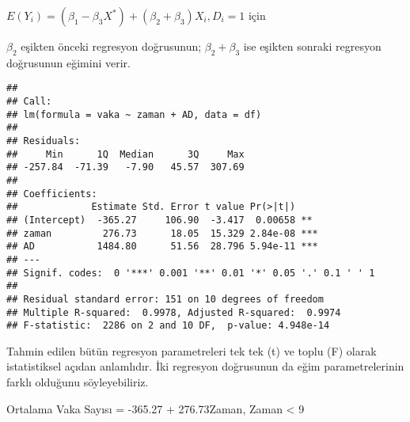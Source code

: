 \documentclass[
]{book}
\newenvironment{Shaded}{\begin{snugshade}}{\end{snugshade}}
\newcommand{\CommentTok}[1]{\textcolor[rgb]{0.56,0.35,0.01}{\textit{#1}}}
\newcommand{\DataTypeTok}[1]{\textcolor[rgb]{0.13,0.29,0.53}{#1}}
\newcommand{\DecValTok}[1]{\textcolor[rgb]{0.00,0.00,0.81}{#1}}
\newcommand{\KeywordTok}[1]{\textcolor[rgb]{0.13,0.29,0.53}{\textbf{#1}}}
\newcommand{\NormalTok}[1]{#1}
\newcommand{\OperatorTok}[1]{\textcolor[rgb]{0.81,0.36,0.00}{\textbf{#1}}}
\newcommand{\StringTok}[1]{\textcolor[rgb]{0.31,0.60,0.02}{#1}}
\begin{document}
\(E(Y_i) = (\beta_1 - \beta_3X^*) + (\beta_2 + \beta_3)X_i, D_i = 1\) için

\(\beta_2\) eşikten önceki regresyon doğrusunun; \(\beta_2 + \beta_3\) ise eşikten sonraki regresyon doğrusunun eğimini verir.

\begin{Shaded}
\end{Shaded}

\begin{verbatim}
## 
## Call:
## lm(formula = vaka ~ zaman + AD, data = df)
## 
## Residuals:
##     Min      1Q  Median      3Q     Max 
## -257.84  -71.39   -7.90   45.57  307.69 
## 
## Coefficients:
##             Estimate Std. Error t value Pr(>|t|)    
## (Intercept)  -365.27     106.90  -3.417  0.00658 ** 
## zaman         276.73      18.05  15.329 2.84e-08 ***
## AD           1484.80      51.56  28.796 5.94e-11 ***
## ---
## Signif. codes:  0 '***' 0.001 '**' 0.01 '*' 0.05 '.' 0.1 ' ' 1
## 
## Residual standard error: 151 on 10 degrees of freedom
## Multiple R-squared:  0.9978, Adjusted R-squared:  0.9974 
## F-statistic:  2286 on 2 and 10 DF,  p-value: 4.948e-14
\end{verbatim}

Tahmin edilen bütün regresyon parametreleri tek tek (t) ve toplu (F) olarak istatistiksel açıdan anlamlıdır. İki regresyon doğrusunun da eğim parametrelerinin farklı olduğunu söyleyebiliriz.

Ortalama Vaka Sayısı = -365.27 + 276.73Zaman, Zaman \textless{} 9
\end{document}
